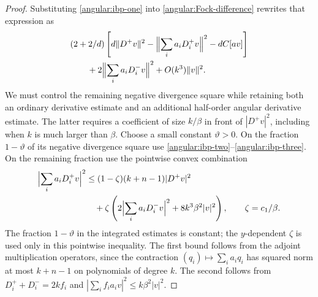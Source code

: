 \documentclass[11pt]{article}
\theoremstyle{definition}
\theoremstyle{remark}
\numberwithin{equation}{section}
\begin{document}
\begin{proof}
Substituting \eqref{angular:ibp-one} into
\eqref{angular:Fock-difference} rewrites that expression as
\begin{equation}\label{angular:after-first-ibp}
 \begin{split}
 &(2+2/d)\left[d\|D^+v\|^2
       -\Bigl\|\sum_i a_iD_i^+v\Bigr\|^2-dC[av]\right]\\
 &\qquad+2\Bigl\|\sum_i a_iD_i^-v\Bigr\|^2
                      +O(k^3)\|v\|^2.
 \end{split}
\end{equation}
We must control the remaining negative divergence square while retaining
both an ordinary derivative estimate and an additional half-order
angular derivative estimate.  The latter requires a coefficient of
size $k/\beta$ in front of $|D^+v|^2$, including when $k$ is much larger
than $\beta$.  Choose a small constant $\vartheta>0$.
On the fraction $1-\vartheta$ of its negative divergence square use
\eqref{angular:ibp-two}--\eqref{angular:ibp-three}.  On the remaining
fraction use the pointwise convex combination
\begin{equation}\label{angular:convex-bound}
 \begin{split}
 \Bigl|\sum_i a_iD_i^+v\Bigr|^2
 &\le(1-\zeta)(k+n-1)|D^+v|^2\\
 &\quad+\zeta\left(2\Bigl|\sum_i a_iD_i^-v\Bigr|^2
                         +8k^3\beta^2|v|^2\right),
 \qquad \zeta=c_1/\beta.
 \end{split}
\end{equation}
The fraction $1-\vartheta$ in the integrated estimates is constant;
the $y$-dependent $\zeta$ is used only in this pointwise inequality.
The first bound follows from the adjoint multiplication operators, since
the contraction $(q_i)\mapsto\sum_i a_iq_i$ has squared norm at most
$k+n-1$ on polynomials of degree $k$.  The second follows from
$D_i^++D_i^-=2k f_i$ and
$|\sum_i f_i a_i v|^2\le k\beta^2|v|^2$.


\end{proof}
\end{document}
